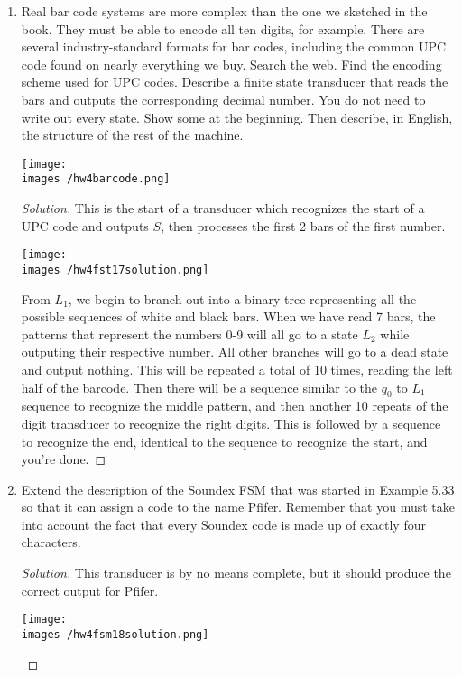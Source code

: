 \documentclass[10pt]{article}
\newcommand{\images}{/home/gparker/classes/341/images}
\begin{document}
\begin{enumerate}[1)]
\item
Real bar code systems are more complex than the one we sketched in the book.  They 
must be able to encode all ten digits, for example.  There are several industry-standard 
formats for bar codes, including the common UPC code found on nearly everything we 
buy.  Search the web.  Find the encoding scheme used for UPC codes.  Describe a finite 
state transducer that reads the bars and outputs the corresponding decimal number.  You do 
not need to write out every state.  Show some at the beginning.  Then describe, in English, 
the structure of the rest of the machine.

\begin{center}
\texttt{[image: \\images /hw4barcode.png]}
\end{center}

\begin{proof}[Solution]
This is the start of a transducer which recognizes the start of a UPC code and outputs $S$, then processes the first 2 bars of the first number.\\
\begin{center}
\texttt{[image: \\images /hw4fst17solution.png]}
\end{center}
From $L_1$, we begin to branch out into a binary tree representing all the possible sequences of white and black bars.  When we have read 7 bars, the patterns that represent the numbers 0-9 will all go to a state $L_2$ while outputing their respective number.  All other branches will go to a dead state and output nothing.  This will be repeated a total of 10 times, reading the left half of the barcode.  Then there will be a sequence similar to the $q_0$ to $L_1$ sequence to recognize the middle pattern, and then another 10 repeats of the digit transducer to recognize the right digits.  This is followed by a sequence to recognize the end, identical to the sequence to recognize the start, and you're done.
\end{proof}

\pagebreak

\item
Extend the description of the Soundex FSM that was started in Example 5.33 so that it can assign a code to the name Pfifer.  Remember that you must take into account the fact that every Soundex code is made up of exactly four characters.

\begin{proof}[Solution]
This transducer is by no means complete, but it should produce the correct output for Pfifer.
\begin{center}
\texttt{[image: \\images /hw4fsm18solution.png]}
\end{center}
\end{proof}


\end{enumerate}
\end{document}
